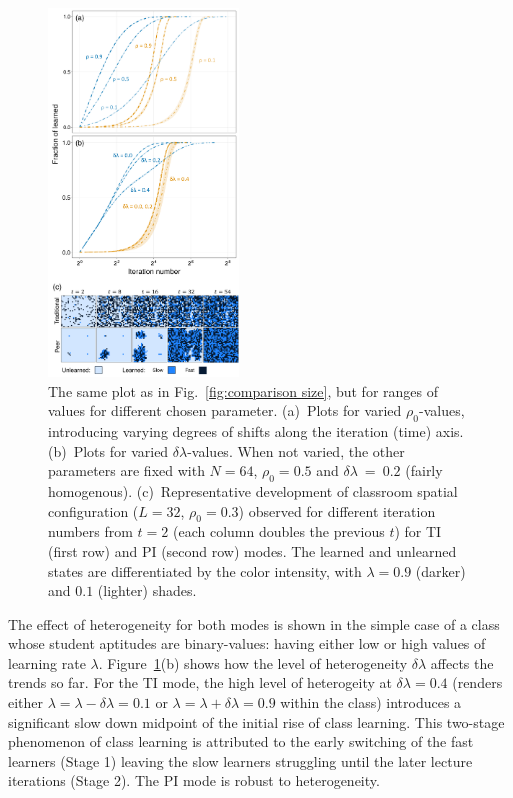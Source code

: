 \documentclass[twocolumn,secnumarabic,amssymb, nobibnotes, aps, prd]{revtex4-2}
\begin{document}
        \begin{figure}[htbp]
        \centering
        \includegraphics[width=0.45\textwidth]{figures/figure4.png}
        \caption{
        The same plot as in Fig.~\ref{fig:comparison size}, but for ranges of values for different chosen parameter.
        (a)~Plots for varied $\rho_0$-values, introducing varying degrees of shifts along the iteration (time) axis.
        (b)~Plots for varied $\delta\lambda$-values.
        When not varied, the other parameters are fixed with $N=64$, $\rho_0=0.5$ and $\delta\lambda~=~0.2$ (fairly homogenous).
        (c)~Representative development of classroom spatial configuration ($L=32$, $\rho_0=0.3$) observed for different iteration numbers from $t=2$ (each column doubles the previous $t$) for TI (first row) and PI (second row) modes.
        The learned and unlearned states are differentiated by the color intensity, with $\lambda=0.9$ (darker) and $0.1$ (lighter) shades.
        }
        \label{fig:comparison rates}
        \end{figure}

        The effect of heterogeneity for both modes is shown in the simple case of a class whose student aptitudes are binary-values: having either low or high values of learning rate $\lambda$.
        Figure~\ref{fig:comparison rates}(b) shows how the level of heterogeneity $\delta\!\lambda$ affects the trends so far.
        For the TI mode, the high level of heterogeity at $\delta\!\lambda=0.4$ (renders either $\lambda=\lambda-\delta\!\lambda=0.1$ or $\lambda=\lambda+\delta\!\lambda=0.9$ within the class) introduces a significant slow down midpoint of the initial rise of class learning.
        This two-stage phenomenon of class learning is attributed to the early switching of the fast learners (Stage 1) leaving the slow learners struggling until the later lecture iterations (Stage 2).
        The PI mode is robust to heterogeneity.
        
\end{document}
